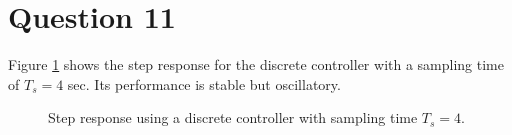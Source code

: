\section{Question 11}

Figure \ref{fig:Q11} shows the step response for the discrete controller with a
sampling time of $T_s=4$ sec. Its performance is stable but oscillatory.

\begin{figure}[H]\centering
	\centering
	\scalebox{0.5}{}
  \caption{Step response using a discrete controller with sampling time $T_s = 4$.}
  \label{fig:Q11}
\end{figure}
